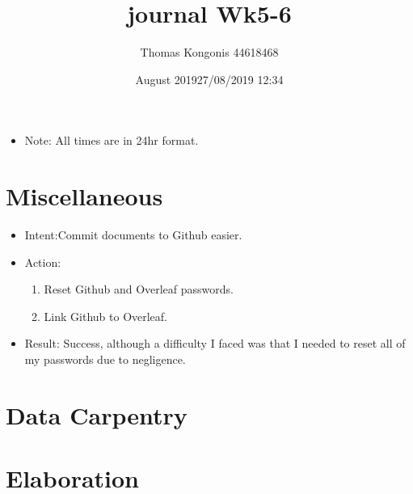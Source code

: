 \documentclass{article}
\title{journal Wk5-6}
\author{Thomas Kongonis 44618468 }
\date{August 2019}
\begin{document}
\maketitle

\tableofcontents
\vspace{5mm}
\begin{itemize}
\item{Note: All times are in 24hr format.}
\end{itemize}

\section{Miscellaneous}

\date{27/08/2019 12:34}
\begin{itemize}
\item{Intent:Commit documents to Github easier.}


\item{Action:}
\begin{enumerate}
    \item{Reset Github and Overleaf passwords.}
    \item{Link Github to Overleaf.}
\end{enumerate}

\item{Result: Success, although a difficulty I faced was that I needed to reset all of my passwords due to negligence.}
\end{itemize}
\vspace{5mm}

\section{Data Carpentry}

\vspace{5mm}
\section{Elaboration}

\vspace{5mm}
\end{document}

